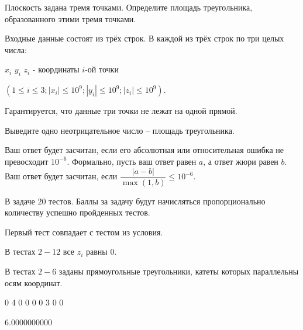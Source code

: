 
Плоскость задана тремя точками. Определите площадь треугольника, образованного этими тремя точками.


Входные данные состоят из трёх строк. В каждой из трёх строк по три целых числа:

$x_i$ $y_i$ $z_i$ - координаты $i$-ой точки

$(1 \leq i \leq 3; |x_{i}| \leq 10^{9}; |y_{i}| \leq 10^{9}; |z_{i}| \leq 10^{9})$.

Гарантируется, что данные три точки не лежат на одной прямой.

\outputfmtSection

Выведите одно неотрицательное число – площадь треугольника.

Ваш ответ будет засчитан, если его абсолютная или относительная ошибка не превосходит 
$10^{-6}$. Формально, пусть ваш ответ равен $a$, а ответ жюри равен $b$. Ваш ответ будет засчитан, 
если $\dfrac {|a - b|}{\max(1, b)} \le 10^{-6}$.

\markSection

В задаче $20$ тестов. Баллы за задачу будут начисляться пропорционально количеству успешно 
пройденных тестов.

Первый тест совпадает с тестом из условия.

В тестах $2-12$ все $z_i$ равны $0$.

В тестах $2-6$ заданы прямоугольные треугольники, катеты которых параллельны осям координат.


\begin{myverbbox}[\small]{\vinput}
    0 4 0
    0 0 0
    3 0 0
\end{myverbbox}
\begin{myverbbox}[\small]{\voutput}
    6.0000000000
\end{myverbbox}

